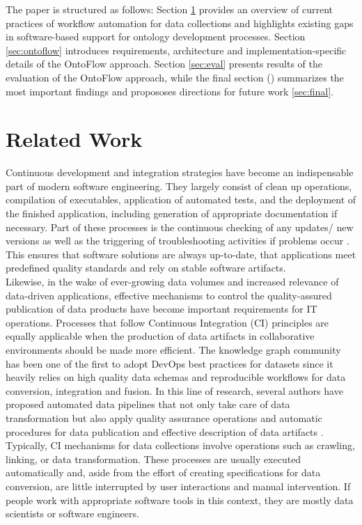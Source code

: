 \documentclass[sigconf]{acmart}
\begin{document}
The paper is structured as follows: Section \ref{sec:related} provides an overview of current practices of workflow automation for data collections and highlights existing gaps in software-based support for ontology development processes. Section \ref{sec:ontoflow} introduces requirements, architecture and implementation-specific details of the OntoFlow approach. Section \ref{sec:eval} presents results of the evaluation of the OntoFlow approach, while the final section () summarizes the most important findings and propososes directions for future work \ref{sec:final}.

\section{Related Work}
\label{sec:related}
Continuous development and integration strategies have become an indispensable part of modern software engineering.
They largely consist of clean up operations, compilation of executables, application of automated tests, and the deployment of the finished application, including generation of appropriate documentation if necessary. Part of these processes is the continuous checking of any updates/ new versions as well as the triggering of troubleshooting activities if problems occur \cite{fowler}.
This ensures that software solutions are always up-to-date, that applications meet predefined quality standards and rely on stable software artifacts.\\
Likewise, in the wake of ever-growing data volumes and increased relevance of data-driven applications, effective mechanisms to control the quality-assured publication of data products have become important requirements for IT operations. Processes that follow Continuous Integration (CI) principles are equally applicable when the production of data artifacts in collaborative environments should be made more efficient. The knowledge graph community has been one of the first to adopt DevOps best practices for datasets since it heavily relies on high quality data schemas and reproducible workflows for data conversion, integration and fusion. In this line of research, several authors have proposed automated data pipelines that not only take care of data transformation but also apply quality assurance operations and automatic procedures for data publication and effective description of data artifacts
\cite{cirulli, klimek, kucera, meissner, rojas, roman, stadler, dataid}. Typically, CI mechanisms for data collections involve operations such as crawling, linking, or data transformation. These processes are usually executed automatically and, aside from the effort of creating specifications for data conversion, are little interrupted by user interactions and manual intervention. If people work with appropriate software tools in this context, they are mostly data scientists or software engineers.\\
\end{document}
